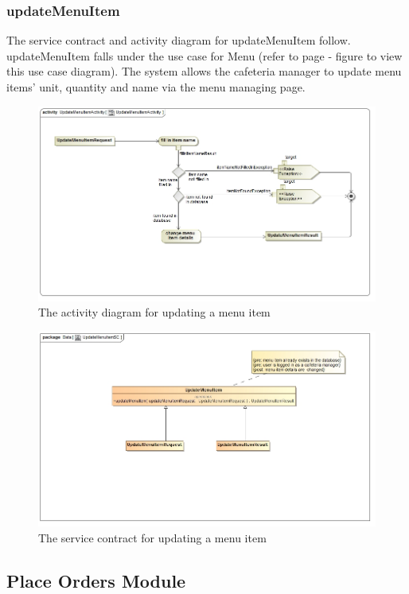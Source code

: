 \documentclass[a4paper,12pt]{article}
\begin{document}
 \subsubsection{updateMenuItem}
The service contract and activity diagram for updateMenuItem follow. updateMenuItem falls under the use case for Menu (refer to page   - figure   to view this use case diagram). The system allows the cafeteria manager to update menu items' unit, quantity and name via the menu managing page.
\begin{figure}[H]
  \centering
    \includegraphics[width=1.0\textwidth]{../images/UpdateMenuItemActivity.jpg}
    \caption{The activity diagram for updating a menu item } 
\end{figure}
\begin{figure}[H]
	\centering
	\includegraphics[width=1.0\textwidth]{../images/UpdateMenuItemSC.jpg}
	\caption{The service contract for updating a menu item}
\end{figure}

\subsection{Place Orders Module}
\end{document}
